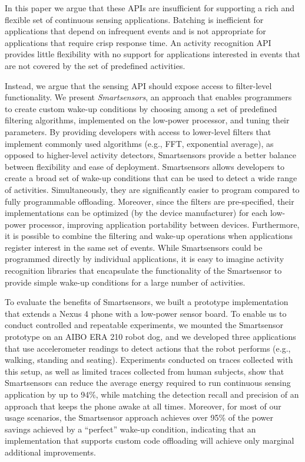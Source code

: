 In this paper we argue that these APIs are insufficient for supporting
a rich and flexible set of continuous sensing applications.
Batching is inefficient for applications that depend on infrequent
events and is not appropriate for applications that require crisp
response time.  An activity recognition API provides little
flexibility with no support for applications interested in events that
are not covered by the set of predefined activities.  

Instead, we argue that the sensing API should expose access to
filter-level functionality.  We present {\em Smartsensors}, an
approach that enables programmers to create custom wake-up conditions
by choosing among a set of predefined filtering algorithms, implemented 
on the low-power processor, and tuning
their parameters.  By providing developers with access to lower-level
filters that implement commonly used algorithms (e.g., FFT,
exponential average), as opposed to higher-level activity detectors,
Smartsensors provide a better balance between flexibility and ease of
deployment.  Smartsensors allows developers to create a broad set of
wake-up conditions that can be used to detect a wide range of
activities.  Simultaneously, they are significantly easier to program
compared to fully programmable offloading.  Moreover, since the
filters are pre-specified, their implementations can be optimized (by
the device manufacturer) for each low-power processor, improving
application portability between devices.  Furthermore, it is possible
to combine the filtering and wake-up operations when applications
register interest in the same set of events.  While Smartsensors could
be programmed directly by individual applications, it is easy to
imagine activity recognition libraries that encapsulate the
functionality of the Smartsensor to provide simple wake-up conditions
for a large number of activities.

To evaluate the benefits of Smartsensors, we built a prototype
implementation that extends a Nexus 4 phone with a low-power sensor
board.  To enable us to conduct controlled and repeatable experiments,
we mounted the Smartsensor prototype on an AIBO ERA 210 robot dog, and
we developed three applications that use accelerometer readings to
detect actions that the robot performs (e.g., walking, standing and
seating).  Experiments conducted on traces collected with this setup,
as well as limited traces collected from human subjects, show that
Smartsensors can reduce the average energy required to run continuous
sensing application by up to 94\%, while matching the detection recall
and precision of an approach that keeps the phone awake at all times.
Moreover, for most of our usage scenarios, the Smartsensor approach
achieves over 95\% of the power savings achieved by a ``perfect''
wake-up condition, indicating that an implementation that supports
custom code offloading will achieve only marginal additional
improvements.

